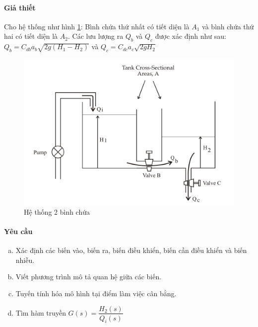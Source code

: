 \documentclass[12pt,a4paper]{article}
\begin{document}
    \paragraph{Giả thiết}
        Cho hệ thống như hình \ref{baitap1}: Bình chứa thứ nhất có tiết diện là $A_1$ và bình chứa thứ hai có tiết diện là $A_2$. Các lưu lượng ra $Q_b$ và $Q_c$ được xác định như sau: $Q_b = C_{db}a_b\sqrt{2g(H_1 - H_2)}$ và $Q_c = C_{dc}a_c\sqrt{2gH_2}$
        \begin{figure}[htp]
            \begin{center}
                \includegraphics[scale=.3]{bai1}
            \end{center}
            \caption{Hệ thống 2 bình chứa} \label{baitap1}
        \end{figure}

    \paragraph{Yêu cầu}
        \begin{enumerate}[a.]
            \item Xác định các biến vào, biến ra, biến điều khiển, biến cần điều khiển và biến nhiễu.
            \item Viết phương trình mô tả quan hệ giữa các biến.
            \item Tuyến tính hóa mô hình tại điểm làm việc cân bằng.
            \item Tìm hàm truyền $G(s) = \dfrac{H_2(s)}{Q_i(s)}$
        \end{enumerate}
\end{document}
